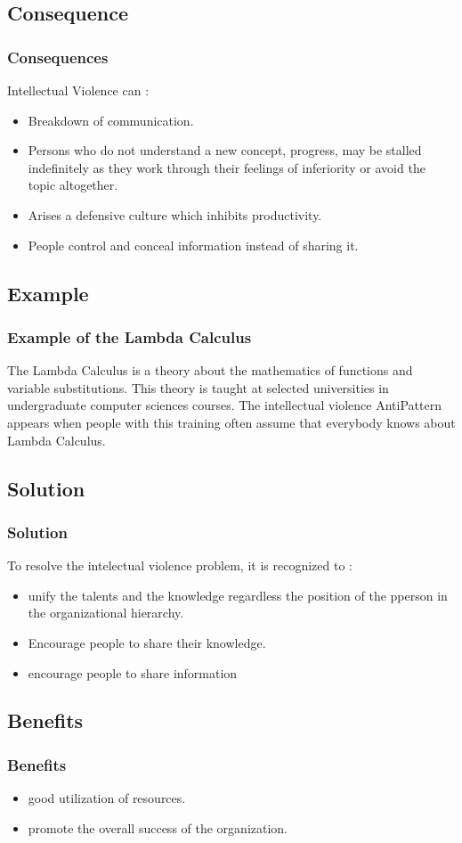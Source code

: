 \documentclass{beamer}
\begin{document}
\subsection{Consequence}
\begin{frame}
\frametitle{Consequences}
Intellectual Violence can :\\
\begin{itemize}
\item  Breakdown of communication.
\item  Persons who do not understand a new concept, progress, may be stalled indefinitely as they work through their feelings of inferiority or avoid the topic altogether.
\item Arises a defensive culture  which inhibits productivity.
\item People control and conceal information instead of sharing it.
\end{itemize}
\end{frame}

\subsection{Example}
\begin{frame}
\frametitle{Example of the Lambda Calculus}
The Lambda Calculus is a theory about the mathematics of functions and variable substitutions. This theory is taught at selected universities in undergraduate computer sciences courses. The intellectual violence AntiPattern  appears when people with this training often assume that everybody knows about Lambda Calculus.
\end{frame}

\subsection{Solution}
\begin{frame}
\frametitle{Solution}
To resolve the intelectual violence problem, it is recognized to :
\begin{itemize}
\item unify the talents and the knowledge regardless the position of the pperson in the organizational hierarchy.
\item  Encourage people to share their knowledge.
\item encourage people to share information
\end{itemize}
\end{frame}

\subsection{Benefits}
\begin{frame}
\frametitle{Benefits}
\begin{itemize}
\item good utilization of resources.
\item promote the overall success of the organization.
\end{itemize}
\end{frame}
\end{document}
